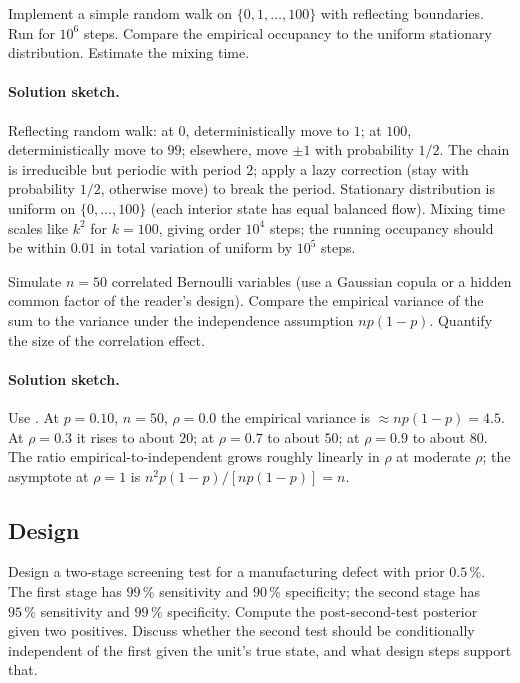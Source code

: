 \begin{exercise}
Implement a simple random walk on $\{0, 1, \ldots, 100\}$ with
reflecting boundaries. Run for $10^{6}$ steps. Compare the
empirical occupancy to the uniform stationary distribution. Estimate
the mixing time.
\end{exercise}

\paragraph{Solution sketch.}
Reflecting random walk: at $0$, deterministically move to $1$; at
$100$, deterministically move to $99$; elsewhere, move $\pm 1$ with
probability $1/2$. The chain is irreducible but periodic with
period $2$; apply a lazy correction (stay with probability $1/2$,
otherwise move) to break the period. Stationary distribution is
uniform on $\{0, \ldots, 100\}$ (each interior state has equal
balanced flow). Mixing time scales like $k^{2}$ for $k = 100$,
giving order $10^{4}$ steps; the running occupancy should be within
$0.01$ in total variation of uniform by $10^{5}$ steps.

\begin{exercise}
Simulate $n = 50$ correlated Bernoulli variables (use a Gaussian
copula or a hidden common factor of the reader's design). Compare
the empirical variance of the sum to the variance under the
independence assumption $np(1-p)$. Quantify the size of the
correlation effect.
\end{exercise}

\paragraph{Solution sketch.}
Use .
At $p = 0.10$, $n = 50$, $\rho = 0.0$ the empirical variance is
$\approx np(1-p) = 4.5$. At $\rho = 0.3$ it rises to about $20$;
at $\rho = 0.7$ to about $50$; at $\rho = 0.9$ to about $80$. The
ratio empirical-to-independent grows roughly linearly in $\rho$ at
moderate $\rho$; the asymptote at $\rho = 1$ is $n^{2}p(1-p)/[np
(1-p)] = n$.

\subsection*{Design}

\begin{exercise}
Design a two-stage screening test for a manufacturing defect with
prior $0.5\,\%$. The first stage has $99\,\%$ sensitivity and
$90\,\%$ specificity; the second stage has $95\,\%$ sensitivity and
$99\,\%$ specificity. Compute the post-second-test posterior given
two positives. Discuss whether the second test should be
conditionally independent of the first given the unit's true
state, and what design steps support that.
\end{exercise}

